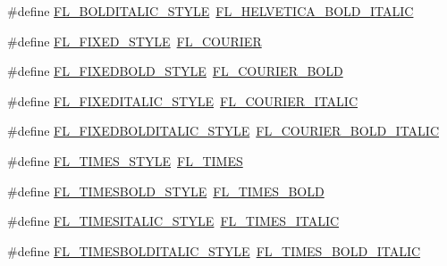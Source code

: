 \begin{DoxyCompactItemize}
\item 
\#define \hyperlink{forms_8_h_a16c2a6b89e0d66231e87bd2e77fb02ee}{F\+L\+\_\+\+B\+O\+L\+D\+I\+T\+A\+L\+I\+C\+\_\+\+S\+T\+Y\+LE}~\hyperlink{_enumerations_8_h_a925bd586f4c991776b48827818c16707}{F\+L\+\_\+\+H\+E\+L\+V\+E\+T\+I\+C\+A\+\_\+\+B\+O\+L\+D\+\_\+\+I\+T\+A\+L\+IC}
\item 
\#define \hyperlink{forms_8_h_afe3cc92ac8523fdaf97197ddc88f0881}{F\+L\+\_\+\+F\+I\+X\+E\+D\+\_\+\+S\+T\+Y\+LE}~\hyperlink{_enumerations_8_h_ae722fe030bd9bcba33f045098295579d}{F\+L\+\_\+\+C\+O\+U\+R\+I\+ER}
\item 
\#define \hyperlink{forms_8_h_ab41c83fccc1cfc42e044b91bb5817f55}{F\+L\+\_\+\+F\+I\+X\+E\+D\+B\+O\+L\+D\+\_\+\+S\+T\+Y\+LE}~\hyperlink{_enumerations_8_h_a311479135f085f16d2a7432af8f482eb}{F\+L\+\_\+\+C\+O\+U\+R\+I\+E\+R\+\_\+\+B\+O\+LD}
\item 
\#define \hyperlink{forms_8_h_adeb310504e2fa459458ae47be84de2cd}{F\+L\+\_\+\+F\+I\+X\+E\+D\+I\+T\+A\+L\+I\+C\+\_\+\+S\+T\+Y\+LE}~\hyperlink{_enumerations_8_h_afc9d9ab48f1f9ff634c30fd2af4bb8ad}{F\+L\+\_\+\+C\+O\+U\+R\+I\+E\+R\+\_\+\+I\+T\+A\+L\+IC}
\item 
\#define \hyperlink{forms_8_h_a75422d4997c9ac69b2db013f9e507be5}{F\+L\+\_\+\+F\+I\+X\+E\+D\+B\+O\+L\+D\+I\+T\+A\+L\+I\+C\+\_\+\+S\+T\+Y\+LE}~\hyperlink{_enumerations_8_h_a812b67c693f4809c778d39d77d15bb90}{F\+L\+\_\+\+C\+O\+U\+R\+I\+E\+R\+\_\+\+B\+O\+L\+D\+\_\+\+I\+T\+A\+L\+IC}
\item 
\#define \hyperlink{forms_8_h_a1186a757043179cdfaf9157cde504330}{F\+L\+\_\+\+T\+I\+M\+E\+S\+\_\+\+S\+T\+Y\+LE}~\hyperlink{_enumerations_8_h_a35fe64b07a0f270411dfbcbcc109033c}{F\+L\+\_\+\+T\+I\+M\+ES}
\item 
\#define \hyperlink{forms_8_h_a3745af9d9ba378ec877025250a1a30fa}{F\+L\+\_\+\+T\+I\+M\+E\+S\+B\+O\+L\+D\+\_\+\+S\+T\+Y\+LE}~\hyperlink{_enumerations_8_h_a41f70582714a3bd83fa3a32fb14b239f}{F\+L\+\_\+\+T\+I\+M\+E\+S\+\_\+\+B\+O\+LD}
\item 
\#define \hyperlink{forms_8_h_a585baee56da4cfdfa5181dc5c5a2d2a6}{F\+L\+\_\+\+T\+I\+M\+E\+S\+I\+T\+A\+L\+I\+C\+\_\+\+S\+T\+Y\+LE}~\hyperlink{_enumerations_8_h_a881c8b4f190bccdf48d2df42ca921586}{F\+L\+\_\+\+T\+I\+M\+E\+S\+\_\+\+I\+T\+A\+L\+IC}
\item 
\#define \hyperlink{forms_8_h_a634860b33b6b2a6a0344c66bd5d45120}{F\+L\+\_\+\+T\+I\+M\+E\+S\+B\+O\+L\+D\+I\+T\+A\+L\+I\+C\+\_\+\+S\+T\+Y\+LE}~\hyperlink{_enumerations_8_h_a1315245575ff4617c3dbee5b42649212}{F\+L\+\_\+\+T\+I\+M\+E\+S\+\_\+\+B\+O\+L\+D\+\_\+\+I\+T\+A\+L\+IC}

\end{DoxyCompactItemize}
